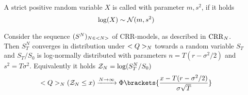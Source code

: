 \begin{definition}
	A strict positive random variable $X$ is called  with parameter $m, s^2$, if it holds
	\begin{align*}
		\log(X) \sim \mathcal{N}(m,s^2)
	\end{align*}
\end{definition}
\begin{theorem}
	Consider the sequence $(S^N)_{N \in <N>}$ of CRR-models, as described in $\operatorname{CRR}_N$. Then $S_T^N$ converges in distribution under $<Q>_N$ towards a random variable $S_T$ and $S_T/S_0$ is log-normally distributed with parameters $n = T(r - \sigma^2/2)$ and $s^2 = T\sigma^2$. Equivalently it holds $\mathcal{Z}_N = \log(S_T^N / S_0)$
	\begin{align*}
		\QQ_N(\ZZ_N \le x) \xrightarrow{N \to \infty} \Phi\brackets{\frac{x-T(r-\sigma^2/2)}{\sigma\sqrt{T}}}
	\end{align*}
\end{theorem}
